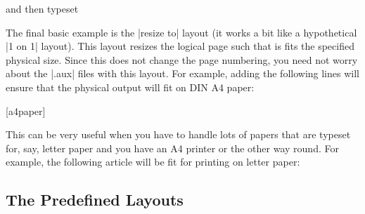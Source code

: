 and then typeset

The final basic example is the |resize to| layout (it works a bit like
a hypothetical |1 on 1| layout). This layout resizes the logical page
such that is fits the specified physical size. Since this does not
change the page numbering, you need not worry about the |.aux| files
with this layout. For example, adding the following lines will ensure
that the physical output will fit on DIN A4 paper:
\begin{codeexample}
\usepackage{pgfpages}
[a4paper]
\end{codeexample}

This can be very useful when you have to handle lots of papers that
are typeset for, say, letter paper and you have an A4 printer or the
other way round. For example, the following article will be fit for
printing on letter paper:



\subsection{The Predefined Layouts}

